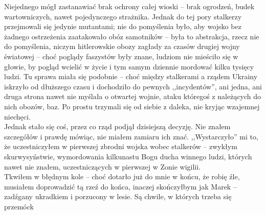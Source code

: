\documentclass[../MAIN.tex]{subfiles}
\begin{document}
Niejednego mógł zastanawiać brak ochrony całej wioski -- brak ogrodzeń, budek wartowniczych, nawet pojedynczego strażnika. Jednak do tej pory stalkerzy przejmowali się jedynie mutantami; nie do pomyślenia było, aby wojsko bez żadnego ostrzeżenia zaatakowało obóz samotników -- była to abstrakcja, rzecz nie do pomyślenia, niczym hitlerowskie obozy zagłady za czasów drugiej wojny światowej -- choć poglądy faszystów były znane, ludziom nie mieściło się w głowie, by pogląd wcielić w życie i tym samym dziennie mordować kilku tysięcy ludzi. Tu sprawa miała się podobnie -- choć między stalkerami a rządem Ukrainy iskrzyło od dłuższego czasu i dochodziło do pewnych ,,incydentów'', ani jedna, ani druga strona nawet nie myślała o otwartej wojnie, ataku któregoś z należących do nich obozów, baz. Po prostu trzymali się od siebie z daleka, nie kryjąc wzajemnej niechęci.\\
Jednak stało się coś, przez co rząd podjął dzisiejszą decyzję. Nie znałem szczegółów i prawdę mówiąc, nie miałem zamiaru ich znać. ,,Wystarczyło'' mi to, że uczestniczyłem w pierwszej zbrodni wojska wobec stalkerów -- zwykłym skurwysyństwie, wymordowania kilkunastu Bogu ducha winnego ludzi, których nawet nie znałem, uczestniczących w pierwszej w Zonie wigilii.\\
Tkwiłem w błędnym kole -- choć dotarło już do mnie w końcu, że robię źle, musiałem doprowadzić tą rzeź do końca, inaczej skończyłbym jak Marek -- zadźgany ukradkiem i porzucony w lesie.
Są chwile, w których trzeba się przemóc\3k
\end{document}
